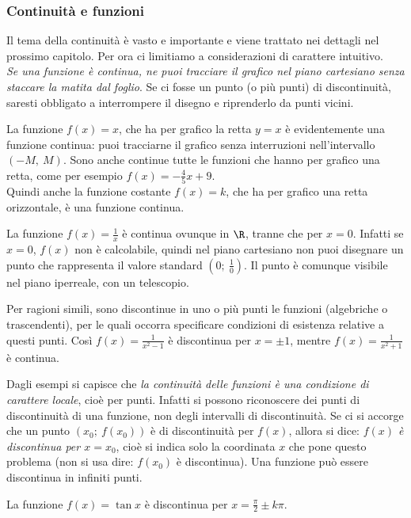 \subsubsection{Continuità e funzioni}
\label{subsubsec:diff01_diffcontinue}
Il tema della continuità è vasto e importante e viene trattato nei dettagli
nel prossimo capitolo. Per ora ci limitiamo a considerazioni di carattere 
intuitivo.\\
\emph{Se una funzione è continua, ne puoi tracciare il grafico nel piano 
cartesiano senza staccare la matita dal foglio}. 
Se ci fosse un punto (o più punti) di discontinuità, saresti obbligato a 
interrompere il disegno e riprenderlo da punti vicini.
\begin{esempio}
 La funzione $f(x)=x$, che ha per grafico la retta $y=x$ è evidentemente 
 una funzione continua: puoi tracciarne il grafico senza interruzioni
 nell'intervallo $(-M,\ M)$. Sono anche continue tutte le funzioni che hanno
 per grafico una retta, come per esempio $f(x)=-\frac{4}{5}x+9$.\\
 Quindi anche la funzione costante $f(x)=k$, che ha per grafico una retta
 orizzontale, è una funzione continua.
\end{esempio}
\begin{esempio}
 La funzione $f(x)=\frac{1}{x}$ è continua ovunque in $\R$, tranne che per 
$x=0$.
 Infatti se $x=0$, $f(x)$ non è calcolabile, quindi nel piano cartesiano 
 non puoi disegnare un punto  che rappresenta il valore standard 
 $(0;~\frac{1}{0})$. 
 Il punto è comunque visibile nel piano iperreale, con  un telescopio.
 \end{esempio}
\begin{esempio}
 Per ragioni simili, sono discontinue in uno o più punti le funzioni
 (algebriche o trascendenti), per le quali occorra specificare condizioni 
 di esistenza relative a questi punti.
 Così $f(x)=\frac{1}{x^2-1}$ è discontinua per $x=\pm 1$, mentre 
 $f(x)=\frac{1}{x^2+1}$ è continua.
\end{esempio}

Dagli esempi si capisce che \emph{la continuità delle funzioni è una 
condizione di carattere locale}, cioè per punti. Infatti si possono 
riconoscere dei punti di discontinuità di una funzione, non degli 
intervalli di discontinuità.
Se ci si accorge che un punto $(x_0;\ f(x_0))$ è di discontinuità
per $f(x)$, allora si dice: \emph{$f(x)$ è discontinua per $x=x_0$},
cioè si indica solo la coordinata $x$ che pone questo problema 
(non si usa dire: $f(x_0)$ è discontinua).
Una funzione può essere discontinua in infiniti punti.
\begin{esempio}
 La funzione $f(x)= \tan x$ è discontinua per $x=\frac{\pi}{2}\pm k\pi$.
\end{esempio}

